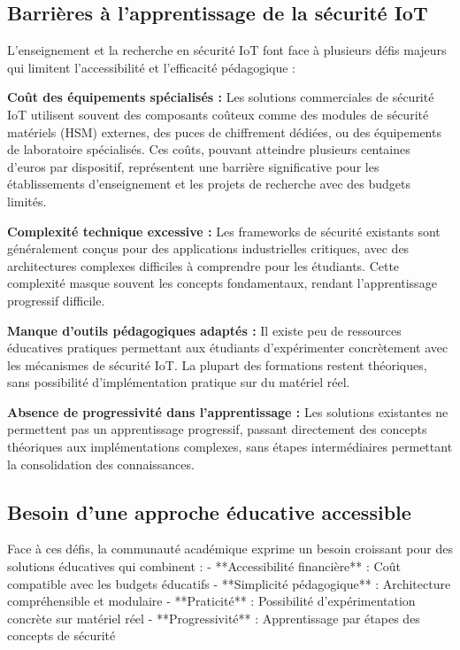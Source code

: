 \subsection{Barrières à l'apprentissage de la sécurité IoT}

L'enseignement et la recherche en sécurité IoT font face à plusieurs défis majeurs qui limitent l'accessibilité et l'efficacité pédagogique :

\textbf{Coût des équipements spécialisés :} Les solutions commerciales de sécurité IoT utilisent souvent des composants coûteux comme des modules de sécurité matériels (HSM) externes, des puces de chiffrement dédiées, ou des équipements de laboratoire spécialisés. Ces coûts, pouvant atteindre plusieurs centaines d'euros par dispositif, représentent une barrière significative pour les établissements d'enseignement et les projets de recherche avec des budgets limités.

\textbf{Complexité technique excessive :} Les frameworks de sécurité existants sont généralement conçus pour des applications industrielles critiques, avec des architectures complexes difficiles à comprendre pour les étudiants. Cette complexité masque souvent les concepts fondamentaux, rendant l'apprentissage progressif difficile.

\textbf{Manque d'outils pédagogiques adaptés :} Il existe peu de ressources éducatives pratiques permettant aux étudiants d'expérimenter concrètement avec les mécanismes de sécurité IoT. La plupart des formations restent théoriques, sans possibilité d'implémentation pratique sur du matériel réel.

\textbf{Absence de progressivité dans l'apprentissage :} Les solutions existantes ne permettent pas un apprentissage progressif, passant directement des concepts théoriques aux implémentations complexes, sans étapes intermédiaires permettant la consolidation des connaissances.

\subsection{Besoin d'une approche éducative accessible}

Face à ces défis, la communauté académique exprime un besoin croissant pour des solutions éducatives qui combinent :
- **Accessibilité financière** : Coût compatible avec les budgets éducatifs
- **Simplicité pédagogique** : Architecture compréhensible et modulaire
- **Praticité** : Possibilité d'expérimentation concrète sur matériel réel
- **Progressivité** : Apprentissage par étapes des concepts de sécurité

